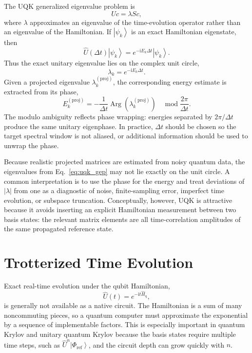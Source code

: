 \documentclass[11pt]{article}
\newcommand{\ii}{\mathrm{i}}
\newcommand{\ket}[1]{\left|#1\right\rangle}
\begin{document}
The UQK generalized eigenvalue problem is
\begin{equation}
    Uc = \lambda Sc,
    \label{eq:uqk_gep}
\end{equation}
where $\lambda$ approximates an eigenvalue of the time-evolution operator rather than an eigenvalue of the Hamiltonian.  If $\ket{\psi_k}$ is an exact Hamiltonian eigenstate, then
\begin{equation}
    \hat{U}(\Delta t)\ket{\psi_k}
    = e^{-\ii E_k\Delta t}\ket{\psi_k}.
\end{equation}
Thus the exact unitary eigenvalue lies on the complex unit circle,
\begin{equation}
    \lambda_k=e^{-\ii E_k\Delta t}.
\end{equation}
Given a projected eigenvalue $\lambda_k^{\mathrm{(proj)}}$, the corresponding energy estimate is extracted from its phase,
\begin{equation}
    E_k^{\mathrm{(proj)}}
    = -\frac{1}{\Delta t}\operatorname{Arg}\left(\lambda_k^{\mathrm{(proj)}}\right)
    \quad \operatorname{mod}\frac{2\pi}{\Delta t}.
    \label{eq:uqk_energy_from_phase}
\end{equation}
The modulo ambiguity reflects phase wrapping: energies separated by $2\pi/\Delta t$ produce the same unitary eigenphase.  In practice, $\Delta t$ should be chosen so the target spectral window is not aliased, or additional information should be used to unwrap the phase.

Because realistic projected matrices are estimated from noisy quantum data, the eigenvalues from Eq.~\eqref{eq:uqk_gep} may not lie exactly on the unit circle.  A common interpretation is to use the phase for the energy and treat deviations of $|\lambda|$ from one as a diagnostic of noise, finite-sampling error, imperfect time evolution, or subspace truncation.  Conceptually, however, UQK is attractive because it avoids inserting an explicit Hamiltonian measurement between two basis states: the relevant matrix elements are all time-correlation amplitudes of the same propagated reference state.

\section{Trotterized Time Evolution}

Exact real-time evolution under the qubit Hamiltonian,
\begin{equation}
    \hat{U}(t)=e^{-\ii t\hat{H}_{\mathrm{q}}},
\end{equation}
is generally not available as a native circuit.  The Hamiltonian is a sum of many noncommuting pieces, so a quantum computer must approximate the exponential by a sequence of implementable factors.  This is especially important in quantum Krylov and unitary quantum Krylov because the basis states require multiple time steps, such as $\hat{U}^n\ket{\Phi_{\mathrm{ref}}}$, and the circuit depth can grow quickly with $n$.
\end{document}
